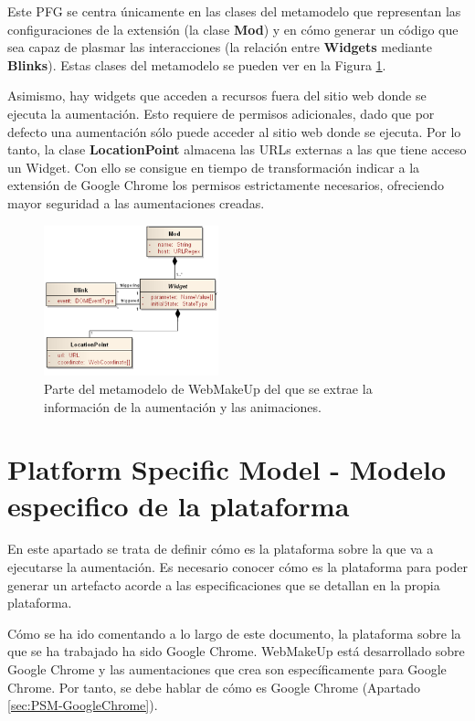 Este PFG se centra únicamente en las clases del metamodelo que representan las configuraciones de la extensión (la clase \textbf{Mod}) y en cómo generar un código que sea capaz de plasmar las interacciones (la relación entre \textbf{Widgets} mediante \textbf{Blinks}). Estas clases del metamodelo se pueden ver en la Figura \ref{fig:MetamodeloWebMakeUpReducido}. 

Asimismo, hay widgets que acceden a recursos fuera del sitio web donde se ejecuta la aumentación. Esto requiere de permisos adicionales, dado que por defecto una aumentación sólo puede acceder al sitio web donde se ejecuta. Por lo tanto, la clase \textbf{LocationPoint} almacena las URLs externas a las que tiene acceso un Widget. Con ello se consigue en tiempo de transformación indicar a la extensión de Google Chrome los permisos estrictamente necesarios, ofreciendo mayor seguridad a las aumentaciones creadas.

\begin{figure}
\begin{center}
\includegraphics[width=0.45\textwidth]{figs/5-MetamodeloWebMakeUpReducido.png}
\caption{Parte del metamodelo de WebMakeUp del que se extrae la información de la aumentación y las animaciones.}
\label{fig:MetamodeloWebMakeUpReducido}
\end{center}
\end{figure}


\section{Platform Specific Model - Modelo especifico de la plataforma}
\label{sec:PSM}

En este apartado se trata de definir cómo es la plataforma sobre la que va a ejecutarse la aumentación. Es necesario conocer cómo es la plataforma para poder generar un artefacto acorde a las especificaciones que se detallan en la propia plataforma.

Cómo se ha ido comentando a lo largo de este documento, la plataforma sobre la que se ha trabajado ha sido Google Chrome. WebMakeUp está desarrollado sobre Google Chrome y las aumentaciones que crea son específicamente para Google Chrome. Por tanto, se debe hablar de cómo es Google Chrome (Apartado \ref{sec:PSM-GoogleChrome}).

